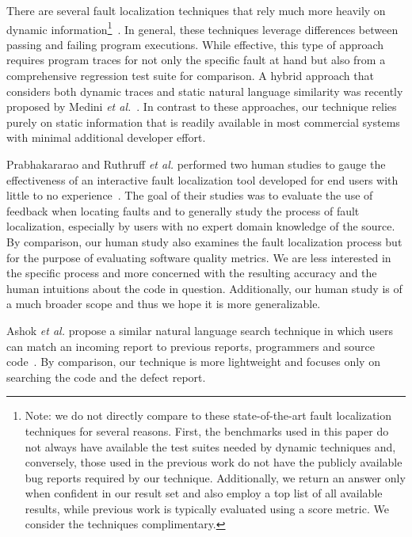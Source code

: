 \documentclass[conference]{IEEEtran}
\begin{document}
There are several fault localization techniques that rely much more heavily
on dynamic information\footnote{Note: we do not directly compare to these
state-of-the-art fault localization techniques for several reasons.  First,
the benchmarks used in this paper do not always have available the test
suites needed by dynamic techniques and, conversely, those used in the
previous work do not have the publicly available bug reports required
by our technique.  Additionally, we return an answer only when confident in
our result set and also employ a top list of all available results, while
previous work is typically evaluated using a score metric.  We consider the
techniques complimentary.}~\cite
{harrold05,Renieris03,cleve05,wang09}.
In general,
these techniques leverage differences between passing and failing program
executions.  While effective, this type of approach requires program traces
for not only the specific fault at hand but also from a comprehensive regression
test suite for comparison.
A hybrid approach that considers both dynamic
traces and static natural language similarity was recently proposed by
Medini \textit{et al.}~\cite{Medini11}.
In contrast to these approaches, our technique relies purely on static
information that is readily available in most commercial systems with minimal
additional developer effort.

Prabhakararao and Ruthruff \emph{et al.} performed two human studies
to gauge the effectiveness of an interactive fault localization tool
developed for end users with little to no
experience~\cite{Prabhakararao03,ruthruff05}.  The goal of their
studies was to evaluate the use of feedback when locating faults and
to generally study the process of fault localization, especially by
users with no expert domain knowledge of the source.  By comparison,
our human study also examines the fault localization process but for
the purpose of evaluating software quality metrics.  We are less
interested in the specific process and more concerned with the
resulting accuracy and the human intuitions about the code in
question.  Additionally, our human study is of a much broader scope and
thus we hope it is more generalizable.


Ashok \textit{et al.} propose a similar natural language search technique
in which users can match an incoming report to previous reports,
programmers and source code~\cite{Ashok09}.  By comparison, our technique
is more lightweight and focuses only on searching the code and the
defect report.
\end{document}
